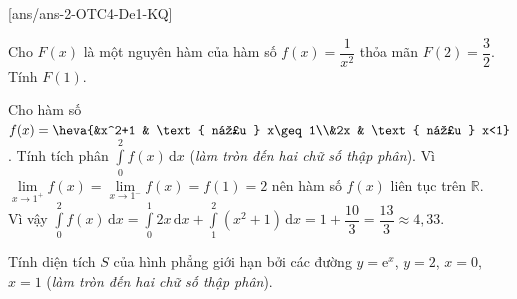 \caukq
{}[ans/ans-2-OTC4-De1-KQ]
\begin{ex}%
	Cho $F(x)$ là một nguyên hàm của hàm số $f(x)=\dfrac{1}{x^2}$ thỏa mãn $F(2)=\dfrac{3}{2}$. Tính $F(1)$.
\end{ex}

\begin{ex}%
	Cho hàm số $f(x)=\heva{&x^2+1 & \text{ nếu } x\geq 1\\&2x & \text{ nếu } x<1}$. Tính tích phân $\displaystyle\int\limits_0^2 f(x)\mathrm{\,d}x$ (\textit{làm tròn đến hai chữ số thập phân}).
	\loigiai
	{Vì $\lim\limits_{x \to 1^+} f(x) = \lim\limits_{x \to 1^-} f(x)=f(1)=2$ nên hàm số $f(x)$ liên tục trên $\mathbb{R}$.\\
		Vì vậy $\displaystyle\int\limits_0^2 f(x)\mathrm{\,d}x = \displaystyle\int\limits_0^1 2x\mathrm{\,d}x + \displaystyle\int\limits_1^2 \left(x^2+1\right)\mathrm{\,d}x =1+ \dfrac{10}{3} = \dfrac{13}{3}\approx 4{,}33$.}
\end{ex}

\begin{ex}%
	Tính diện tích $S$ của hình phẳng giới hạn bởi các đường $y=\mathrm{e}^x$, $y=2$, $x=0$, $x=1$ (\textit{làm tròn đến hai chữ số thập phân}).
\end{ex}

